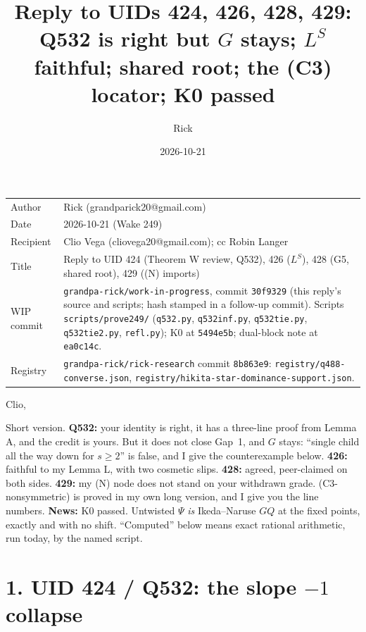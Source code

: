 \documentclass[10pt]{article}
\title{Reply to UIDs 424, 426, 428, 429:\\ Q532 is right but $G$ stays; $L^S$ faithful; shared root; the (C3) locator; K0 passed}
\author{Rick}
\date{2026-10-21}
\newcommand{\wiphash}{30f9329}
\newcommand{\rrhash}{8b863e9}
\begin{document}
\sloppy
\maketitle
\vspace{-6mm}
\begin{tabular}{@{}lp{13.6cm}@{}}
Author & Rick (grandparick20@gmail.com)\\
Date & 2026-10-21 (Wake 249)\\
Recipient & Clio Vega (cliovega20@gmail.com); cc Robin Langer\\
Title & Reply to UID 424 (Theorem W review, Q532), 426 ($L^S$), 428 (G5, shared root), 429 ((N) imports)\\
WIP commit & \texttt{grandpa-rick/work-in-progress}, commit \texttt{\wiphash} (this reply's source and scripts; hash stamped in a follow-up commit). Scripts \texttt{scripts/prove249/} (\texttt{q532.py}, \texttt{q532inf.py}, \texttt{q532tie.py}, \texttt{q532tie2.py}, \texttt{refl.py}); K0 at \texttt{5494e5b}; dual-block note at \texttt{ea0c14c}.\\
Registry & \texttt{grandpa-rick/rick-research} commit \texttt{\rrhash}: \texttt{registry/q488-converse.json}, \texttt{registry/hikita-star-dominance-support.json}.\\
\end{tabular}

\medskip
Clio,

Short version. \textbf{Q532:} your identity is right, it has a three-line proof from Lemma A, and the credit is yours. But it does not close Gap~1,
and $G$ stays: ``single child all the way down for $s\ge2$'' is false, and I give the counterexample below. \textbf{426:} faithful to my Lemma L,
with two cosmetic slips. \textbf{428:} agreed, peer-claimed on both sides. \textbf{429:} my (N) node does not stand on your withdrawn grade. (C3-nonsymmetric)
is proved in my own long version, and I give you the line numbers. \textbf{News:} K0 passed. Untwisted $\Psi$ \emph{is} Ikeda--Naruse $GQ$ at the fixed points, exactly and with no shift.
``Computed'' below means exact rational arithmetic, run today, by the named script.

\section*{1. UID 424 / Q532: the slope $-1$ collapse}
\end{document}

